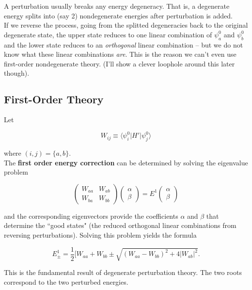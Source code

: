 \documentclass[svgnames]{article}
\begin{document}
A perturbation usually breaks any energy degeneracy. That is, a degenerate energy splits into (say 2)  
nondegenerate energies after perturbation is added. \\

If we reverse the process, going from the 
splitted degeneracies back to the original degenerate state, the upper state reduces to one 
linear combination of $\psi_a^{0}$ and $\psi_b^{0}$ and the lower state reduces to an \textit{orthogonal}
linear combination -- but we do not know what these linear combinations \textit{are}. This is the reason 
we can't even use first-order nondegenerate theory. (I'll show a clever loophole around this later though). 

\subsection{First-Order Theory}

Let 

\[
    W_{ij} \equiv \big\langle \psi_i^{0} | H' | \psi_j^{0} \big\rangle
\] \vspace{3px}

where $(i,j) = \{a, b\}$. \\ 

The \textbf{first order energy correction} can be determined by solving the 
eigenvalue problem 

\[
\begin{pmatrix}
    W_{aa} & W_{ab} \\ 
    W_{ba} & W_{bb}
\end{pmatrix} 
\begin{pmatrix}
  \alpha \\ \beta
\end{pmatrix}
 = E^1 \begin{pmatrix}
     \alpha \\ \beta
 \end{pmatrix} 
\] \vspace{3px}

and the corresponding eigenvectors provide the coefficients $\alpha$ and $\beta$ that determine the 
``good states" (the reduced orthogonal linear combinations from reversing perturbations). Solving this problem 
yields the formula 

\[
\boxed{ 
    E_\pm^{1} = \frac{1}{2} \big[ W_{aa} + W_{bb} \pm \sqrt{(W_{aa} - W_{bb})^2 + 4|W_{ab}|^2}.
    }
\] \vspace{3px}

This is the fundamental result of degenerate perturbation theory. The two roots correspond to the two perturbed 
energies. 
\end{document}
